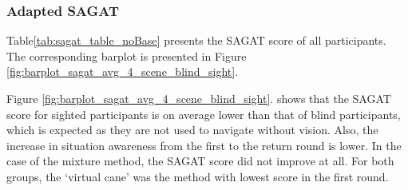 \subsubsection{Adapted SAGAT}
\label{subsubsec:results_adapted_sagat_2}

Table\ref{tab:sagat_table_noBase} presents the SAGAT score of all participants. The corresponding barplot is presented in Figure \ref{fig:barplot_sagat_avg_4_scene_blind_sight}.



Figure \ref{fig:barplot_sagat_avg_4_scene_blind_sight}. shows that the SAGAT score for sighted participants is on average lower than that of blind participants, which is expected as they are not used to navigate without vision. Also, the increase in situation awareness from the first to the return round is lower. In the case of the mixture method, the SAGAT score did not improve at all. For both groups, the ‘virtual cane’ was the method with lowest score in the first round.

